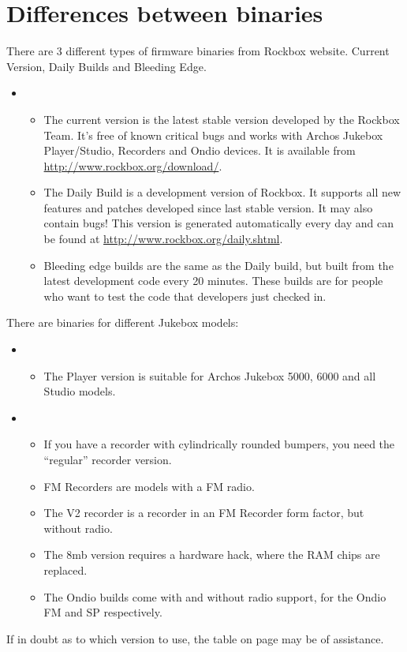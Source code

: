 \section{\label{ref:PartISection1}Differences between binaries}
There are 3 different types of firmware binaries from Rockbox website. Current Version, Daily Builds and Bleeding Edge.

\begin{itemize}
\item \begin{itemize}
\item The current version is the latest stable version developed by the
Rockbox Team. It's free of known critical bugs and works with Archos
Jukebox Player/Studio, Recorders and Ondio devices.  It is available
from 
\url{http://www.rockbox.org/download/}.
\item The Daily Build is a development version of Rockbox. It supports all new features and patches developed since last stable version. It may also contain bugs! This version is generated automatically every day and can be found at
\url{http://www.rockbox.org/daily.shtml}.
\item Bleeding edge builds are the same as the Daily build, but built
from the latest development code every 20 minutes. These builds are for
people who want to test the code that developers just checked in.
\end{itemize}
\end{itemize}
There are binaries for different Jukebox models: 

\begin{itemize}
\item \begin{itemize}
\item The Player version is suitable for Archos Jukebox 5000, 6000 and
all Studio models.
\end{itemize}
\end{itemize}
\begin{itemize}
\item \begin{itemize}
\item If you have a recorder with cylindrically rounded bumpers, you
need the ``regular'' recorder version. 
\item FM Recorders are models with a FM radio.
\item The V2 recorder is a recorder in an FM Recorder form factor, but
without radio. 
\item The 8mb version requires a hardware hack, where the RAM chips are
replaced. 
\item  The Ondio builds come with and without radio support, for the
Ondio FM and SP respectively.
\end{itemize}
\end{itemize}
If in doubt as to which version to use, the table on page
\pageref{ref:Jukeboxtypetable} may be of assistance.

